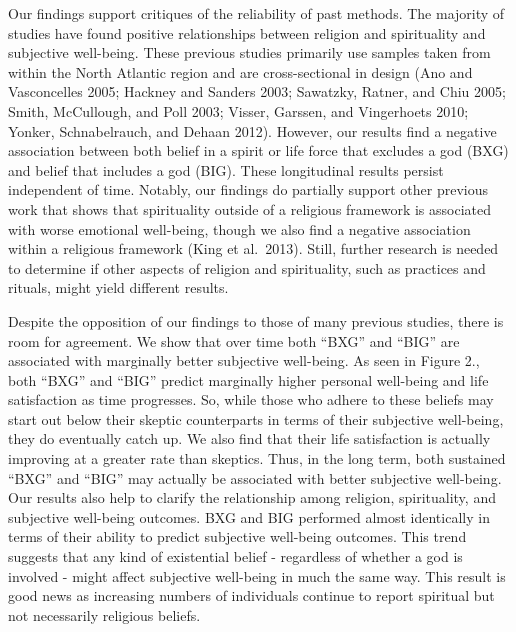 \documentclass[
  english,
  man]{apa6}
\begin{document}
Our findings support critiques of the reliability of past methods. The majority of studies have found positive relationships between religion and spirituality and subjective well-being. These previous studies primarily use samples taken from within the North Atlantic region and are cross-sectional in design (Ano and Vasconcelles 2005; Hackney and Sanders 2003; Sawatzky, Ratner, and Chiu 2005; Smith, McCullough, and Poll 2003; Visser, Garssen, and Vingerhoets 2010; Yonker, Schnabelrauch, and Dehaan 2012). However, our results find a negative association between both belief in a spirit or life force that excludes a god (BXG) and belief that includes a god (BIG). These longitudinal results persist independent of time. Notably, our findings do partially support other previous work that shows that spirituality outside of a religious framework is associated with worse emotional well-being, though we also find a negative association within a religious framework (King et al.~2013). Still, further research is needed to determine if other aspects of religion and spirituality, such as practices and rituals, might yield different results.

Despite the opposition of our findings to those of many previous studies, there is room for agreement. We show that over time both \enquote{BXG} and \enquote{BIG} are associated with marginally better subjective well-being. As seen in Figure 2., both \enquote{BXG} and \enquote{BIG} predict marginally higher personal well-being and life satisfaction as time progresses. So, while those who adhere to these beliefs may start out below their skeptic counterparts in terms of their subjective well-being, they do eventually catch up. We also find that their life satisfaction is actually improving at a greater rate than skeptics. Thus, in the long term, both sustained \enquote{BXG} and \enquote{BIG} may actually be associated with better subjective well-being.
Our results also help to clarify the relationship among religion, spirituality, and subjective well-being outcomes. BXG and BIG performed almost identically in terms of their ability to predict subjective well-being outcomes. This trend suggests that any kind of existential belief - regardless of whether a god is involved - might affect subjective well-being in much the same way. This result is good news as increasing numbers of individuals continue to report spiritual but not necessarily religious beliefs.
\end{document}
